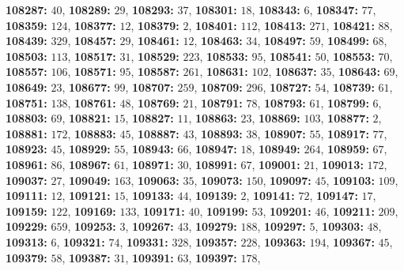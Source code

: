 \textsf{\bfseries 108287:} $40$, \textsf{\bfseries 108289:} $29$, \textsf{\bfseries 108293:} $37$, \textsf{\bfseries 108301:} $18$, \textsf{\bfseries 108343:} $6$, \textsf{\bfseries 108347:} $77$, \textsf{\bfseries 108359:} $124$, \textsf{\bfseries 108377:} $12$, \textsf{\bfseries 108379:} $2$, \textsf{\bfseries 108401:} $112$, \textsf{\bfseries 108413:} $271$, \textsf{\bfseries 108421:} $88$, \textsf{\bfseries 108439:} $329$, \textsf{\bfseries 108457:} $29$, \textsf{\bfseries 108461:} $12$, \textsf{\bfseries 108463:} $34$, \textsf{\bfseries 108497:} $59$, \textsf{\bfseries 108499:} $68$, \textsf{\bfseries 108503:} $113$, \textsf{\bfseries 108517:} $31$, \textsf{\bfseries 108529:} $223$, \textsf{\bfseries 108533:} $95$, \textsf{\bfseries 108541:} $50$, \textsf{\bfseries 108553:} $70$, \textsf{\bfseries 108557:} $106$, \textsf{\bfseries 108571:} $95$, \textsf{\bfseries 108587:} $261$, \textsf{\bfseries 108631:} $102$, \textsf{\bfseries 108637:} $35$, \textsf{\bfseries 108643:} $69$, \textsf{\bfseries 108649:} $23$, \textsf{\bfseries 108677:} $99$, \textsf{\bfseries 108707:} $259$, \textsf{\bfseries 108709:} $296$, \textsf{\bfseries 108727:} $54$, \textsf{\bfseries 108739:} $61$, \textsf{\bfseries 108751:} $138$, \textsf{\bfseries 108761:} $48$, \textsf{\bfseries 108769:} $21$, \textsf{\bfseries 108791:} $78$, \textsf{\bfseries 108793:} $61$, \textsf{\bfseries 108799:} $6$, \textsf{\bfseries 108803:} $69$, \textsf{\bfseries 108821:} $15$, \textsf{\bfseries 108827:} $11$, \textsf{\bfseries 108863:} $23$, \textsf{\bfseries 108869:} $103$, \textsf{\bfseries 108877:} $2$, \textsf{\bfseries 108881:} $172$, \textsf{\bfseries 108883:} $45$, \textsf{\bfseries 108887:} $43$, \textsf{\bfseries 108893:} $38$, \textsf{\bfseries 108907:} $55$, \textsf{\bfseries 108917:} $77$, \textsf{\bfseries 108923:} $45$, \textsf{\bfseries 108929:} $55$, \textsf{\bfseries 108943:} $66$, \textsf{\bfseries 108947:} $18$, \textsf{\bfseries 108949:} $264$, \textsf{\bfseries 108959:} $67$, \textsf{\bfseries 108961:} $86$, \textsf{\bfseries 108967:} $61$, \textsf{\bfseries 108971:} $30$, \textsf{\bfseries 108991:} $67$, \textsf{\bfseries 109001:} $21$, \textsf{\bfseries 109013:} $172$, \textsf{\bfseries 109037:} $27$, \textsf{\bfseries 109049:} $163$, \textsf{\bfseries 109063:} $35$, \textsf{\bfseries 109073:} $150$, \textsf{\bfseries 109097:} $45$, \textsf{\bfseries 109103:} $109$, \textsf{\bfseries 109111:} $12$, \textsf{\bfseries 109121:} $15$, \textsf{\bfseries 109133:} $44$, \textsf{\bfseries 109139:} $2$, \textsf{\bfseries 109141:} $72$, \textsf{\bfseries 109147:} $17$, \textsf{\bfseries 109159:} $122$, \textsf{\bfseries 109169:} $133$, \textsf{\bfseries 109171:} $40$, \textsf{\bfseries 109199:} $53$, \textsf{\bfseries 109201:} $46$, \textsf{\bfseries 109211:} $209$, \textsf{\bfseries 109229:} $659$, \textsf{\bfseries 109253:} $3$, \textsf{\bfseries 109267:} $43$, \textsf{\bfseries 109279:} $188$, \textsf{\bfseries 109297:} $5$, \textsf{\bfseries 109303:} $48$, \textsf{\bfseries 109313:} $6$, \textsf{\bfseries 109321:} $74$, \textsf{\bfseries 109331:} $328$, \textsf{\bfseries 109357:} $228$, \textsf{\bfseries 109363:} $194$, \textsf{\bfseries 109367:} $45$, \textsf{\bfseries 109379:} $58$, \textsf{\bfseries 109387:} $31$, \textsf{\bfseries 109391:} $63$, \textsf{\bfseries 109397:} $178$, 

